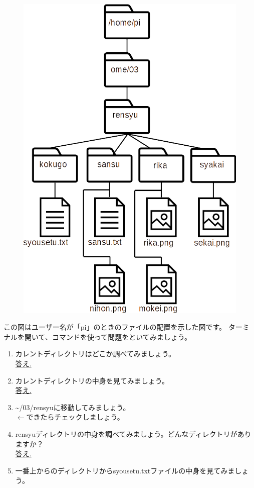 
\begin{tcolorbox}[title=\useOmetoi,breakable]
\begin{figure}[H]
    \centering
    \includegraphics[width=0.6\linewidth]{images/chap03/text03-img029.png}
\end{figure}
この図はユーザー名が「pi」のときのファイルの配置を示した図です。
ターミナルを開いて、コマンドを使って問題をといてみましょう。\\
\begin{enumerate}
\item カレントディレクトリはどこか調べてみましょう。\\
\underline{答え.\hspace{0.8\linewidth}}
\item カレントディレクトリの中身を見てみましょう。\\
\underline{答え.\hspace{0.8\linewidth}}
\item \textasciitilde /03/rensyuに移動してみましょう。\\
\fbox{\phantom{白}} $\leftarrow$できたらチェックしましょう。
\item rensyuディレクトリの中身を調べてみましょう。どんなディレクトリがありますか？\\
\underline{答え.\hspace{0.8\linewidth}}
\item 一番上からのディレクトリからsyousetu.txtファイルの中身を見てみましょう。\\

\end{enumerate}
\end{tcolorbox}
